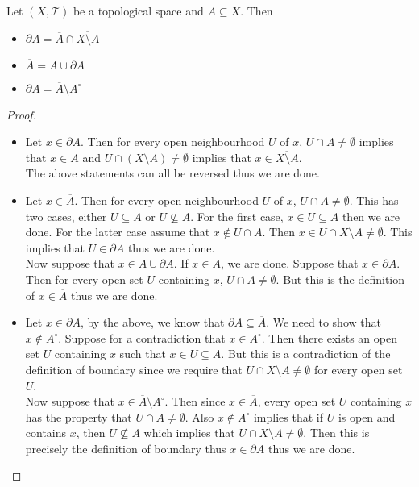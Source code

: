 \documentclass[a4paper]{article}
\begin{document}
\begin{prp}{}{} Let $(X,\mathcal{T})$ be a topological space and $A\subseteq X$. Then 
\begin{itemize}
\item $\partial A=\overline{A}\cap\overline{X\setminus A}$
\item $\overline{A}=A\cup\partial A$
\item $\partial A=\overline{A}\setminus A^\circ$
\end{itemize} 
\begin{proof}~\\
\begin{itemize}
\item Let $x\in\partial A$. Then for every open neighbourhood $U$ of $x$, $U\cap A\neq\emptyset$ implies that $x\in\overline{A}$ and $U\cap(X\setminus A)\neq\emptyset$ implies that $x\in\overline{X\setminus A}$. \\
The above statements can all be reversed thus we are done. 
\item Let $x\in\overline{A}$. Then for every open neighbourhood $U$ of $x$, $U\cap A\neq\emptyset$. This has two cases, either $U\subseteq A$ or $U\not\subseteq A$. For the first case, $x\in U\subseteq A$ then we are done. For the latter case assume that $x\notin U\cap A$. Then $x\in U\cap X\setminus A\neq\emptyset$. This implies that $U\in\partial A$ thus we are done. \\
Now suppose that $x\in A\cup\partial A$. If $x\in A$, we are done. Suppose that $x\in\partial A$. Then for every open set $U$ containing $x$, $U\cap A\neq\emptyset$. But this is the definition of $x\in\overline{A}$ thus we are done. 
\item Let $x\in\partial A$, by the above, we know that $\partial A\subseteq\overline{A}$. We need to show that $x\notin A^\circ$. Suppose for a contradiction that $x\in A^\circ$. Then there exists an open set $U$ containing $x$ such that $x\in U\subseteq A$. But this is a contradiction of the definition of boundary since we require that $U\cap X\setminus A\neq\emptyset$ for every open set $U$. \\
Now suppose that $x\in\overline{A}\setminus A^\circ$. Then since $x\in\overline{A}$, every open set $U$ containing $x$ has the property that $U\cap A\neq\emptyset$. Also $x\notin A^\circ$ implies that if $U$ is open and contains $x$, then $U\not\subseteq A$ which implies that $U\cap X\setminus A\neq\emptyset$. Then this is precisely the definition of boundary thus $x\in\partial A$ thus we are done. 
\end{itemize}
\end{proof}
\end{prp}
\end{document}
